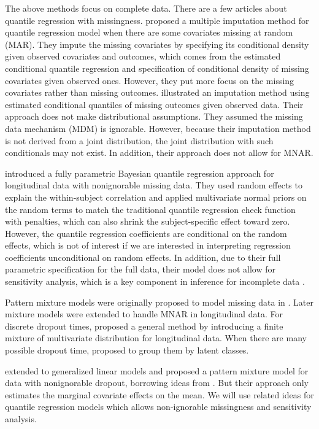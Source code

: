 \documentclass[12pt]{article}
\begin{document}
The above methods focus on complete data.  There are a few articles
about quantile regression with missingness.  \citet{wei2012} proposed
a multiple imputation method for quantile regression model when there
are some covariates missing at random (MAR). They impute the missing
covariates by specifying its conditional density given observed
covariates and outcomes, which comes from the estimated conditional
quantile regression and specification of conditional density of
missing covariates given observed ones.  However, they put more focus
on the missing covariates rather than missing outcomes.
\citet{bottai2013} illustrated an imputation method using estimated
conditional quantiles of missing outcomes given observed data. Their
approach does not make distributional assumptions.  They assumed the
missing data mechanism (MDM) is ignorable. However, because their
imputation method is not derived from a joint distribution, the joint
distribution with such conditionals may not exist.  In addition, their
approach does not allow for MNAR.

\citet{yuan2010} introduced a fully parametric Bayesian quantile
regression approach for longitudinal data with nonignorable missing
data. They used random effects to explain the within-subject
correlation and applied multivariate normal priors on the random terms
to match the traditional quantile regression check function with
penalties, which can also shrink the subject-specific effect toward
zero. However, the quantile regression coefficients are conditional on
the random effects, which is not of interest if we are interested in
interpreting regression coefficients unconditional on random effects.
In addition, due to their full parametric specification for the full
data, their model does not allow for sensitivity analysis, which is a
key component in inference for incomplete data \citep{nas2010}.

Pattern mixture models were originally proposed to model missing data
in \citet{rubin1977}. Later mixture models were extended to handle
MNAR in longitudinal data. For discrete dropout times,
\citet{little1993, little1994} proposed a general method by
introducing a finite mixture of multivariate distribution for
longitudinal data. When there are many possible dropout time,
\citet{roy2003} proposed to group them by latent classes.

\citet{roy2008} extended \cite{roy2003} to generalized linear models
and proposed a pattern mixture model for data with nonignorable
dropout, borrowing ideas from \citet{heagerty1999}.  But their
approach only estimates the marginal covariate effects on the mean. We
will use related ideas for quantile regression models which allows
non-ignorable missingness and sensitivity analysis.
\end{document}
